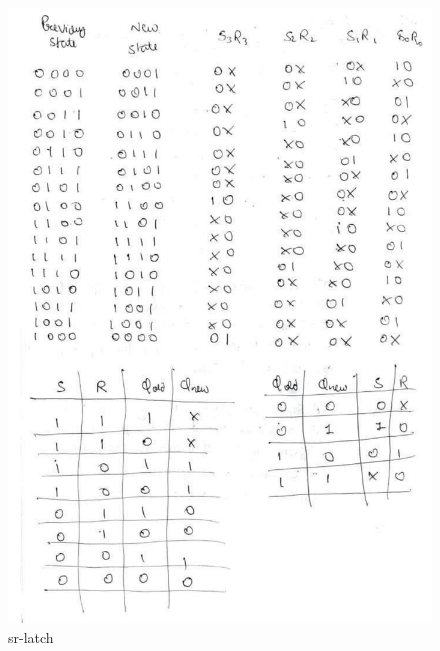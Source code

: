 \documentclass[12pt]{article}
\begin{document}
    
    \begin{figure}
        \centering
        \includegraphics[width=\linewidth]{sr-latch.png}
        \caption{sr-latch}
        \label{fig:enter-label}
    \end{figure}
\end{document}
